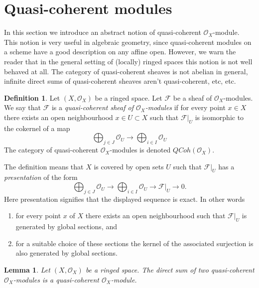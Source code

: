 \documentclass{stacks-project}
\theoremstyle{plain}
\newtheorem{lemma}[subsection]{Lemma}
\theoremstyle{definition}
\newtheorem{definition}[subsection]{Definition}
\theoremstyle{remark}
\numberwithin{equation}{subsection}
\def\QCoh{\mathit{QCoh}}
\begin{document}
\section{Quasi-coherent modules}
\label{section-quasi-coherent}

\noindent
In this section we introduce an abstract notion of
quasi-coherent $\mathcal{O}_X$-module. This notion is very
useful in algebraic geometry, since quasi-coherent modules
on a scheme have a good description on any affine open.
However, we warn the reader that
in the general setting of (locally) ringed spaces
this notion is not well behaved at all. The category of
quasi-coherent sheaves is not abelian in general, infinite
direct sums of quasi-coherent sheaves aren't quasi-coherent, etc, etc.

\begin{definition}
\label{definition-quasi-coherent}
Let $(X, \mathcal{O}_X)$ be a ringed space.
Let $\mathcal{F}$ be a sheaf of $\mathcal{O}_X$-modules.
We say that $\mathcal{F}$ is a {\it quasi-coherent
sheaf of $\mathcal{O}_X$-modules} if for every
point $x \in X$ there exists an open neighbourhood
$x\in U \subset X$ such that $\mathcal{F}|_U$
is isomorphic to the cokernel of a map
$$
\bigoplus\nolimits_{j \in J}
\mathcal{O}_U
\longrightarrow
\bigoplus\nolimits_{i \in I}
\mathcal{O}_U
$$
The category of quasi-coherent $\mathcal{O}_X$-modules
is denoted $\QCoh(\mathcal{O}_X)$.
\end{definition}

\noindent
The definition means that $X$ is covered by open sets $U$
such that $\mathcal{F}|_U$ has a {\it presentation}
of the form
$$
\bigoplus\nolimits_{j \in J}
\mathcal{O}_U
\longrightarrow
\bigoplus\nolimits_{i \in I}
\mathcal{O}_U
\longrightarrow
\mathcal{F}|_U
\longrightarrow
0.
$$
Here presentation signifies that the displayed
sequence is exact. In other words
\begin{enumerate}
\item for every point $x$ of $X$ there exists
an open neighbourhood such that $\mathcal{F}|_U$
is generated by global sections, and
\item for a suitable choice of these sections
the kernel of the associated surjection is also
generated by global sections.
\end{enumerate}

\begin{lemma}
\label{lemma-direct-sum-quasi-coherent}
Let $(X, \mathcal{O}_X)$ be a ringed space.
The direct sum of two quasi-coherent $\mathcal{O}_X$-modules is
a quasi-coherent $\mathcal{O}_X$-module.
\end{lemma}
\end{document}
